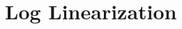 \documentclass[english,xcolor=svgnames]{beamer}
\begin{document}
%
%



\section{Log Linearization}
\end{document}
